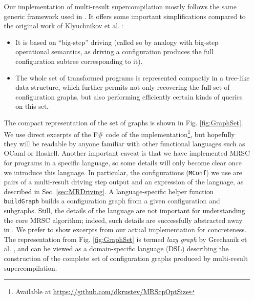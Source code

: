 \documentclass[submission,copyright,creativecommons]{eptcs}
\begin{document}
Our implementation of multi-result supercompilation mostly follows the same
generic framework used in \cite{Romanenko2014StagedMRSC,krustev2014approach}.
It offers some important simplifications compared to the original work
of Klyuchnikov et al. \cite{KlyuchnikovMRSCBranch,Klyuchnikov:META2012:MRSC}:
\begin{itemize}
  \item It is based on ``big-step'' driving (called so by analogy with big-step
    operational semantics, as driving a configuration produces
    the full configuration subtree corresponding to it).
  \item The whole set of transformed programs is represented compactly
    in a tree-like data structure, which further permits not only
    recovering the full set of configuration graphs, but also
    performing efficiently certain kinds of queries on this set.
\end{itemize}
The compact representation of the set of graphs is shown in Fig. \ref{fig:GraphSet}.
We use direct excerpts of the F\# code of the implementation\footnote{Available at
\url{https://github.com/dkrustev/MRScpOptSize}}, but hopefully
they will be readable by anyone familiar with other functional languages such as OCaml or Haskell.
Another important caveat is that we have implemented MRSC for programs in a specific language,
so some details will only become clear once we introduce this language.
In particular, the configurations (\verb|MConf|) we use are 
pairs of a multi-result driving step output and an expression of the language,
as described in Sec. \ref{sec:MRDriving}.
A language-specific helper function \verb|buildGraph| builds a configuration graph
from a given configuration and subgraphs.
Still, the details of the language are not important for understanding the core
MRSC algorithm; indeed, such details are successfully abstracted away in \cite{Romanenko2014StagedMRSC,krustev2014approach}.
We prefer to show excerpts from our actual implementation for concreteness.
The representation from Fig. \ref{fig:GraphSet} is termed \emph{lazy graph} by Grechanik et al. \cite{Romanenko2014StagedMRSC},
and can be viewed as a domain-specific language (DSL) describing the construction of the
complete set of configuration graphs produced by multi-result supercompilation.
\end{document}
